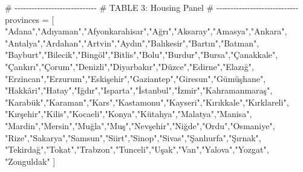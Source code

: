 \documentclass[
  11pt,
  a4paper,
]{article}
\newenvironment{Shaded}{\begin{snugshade}}{\end{snugshade}}
\newcommand{\CommentTok}[1]{\textcolor[rgb]{0.37,0.37,0.37}{#1}}
\newcommand{\NormalTok}[1]{\textcolor[rgb]{0.00,0.23,0.31}{#1}}
\newcommand{\OperatorTok}[1]{\textcolor[rgb]{0.37,0.37,0.37}{#1}}
\newcommand{\StringTok}[1]{\textcolor[rgb]{0.13,0.47,0.30}{#1}}
\begin{document}
\begin{Shaded}
\begin{Highlighting}[]
\CommentTok{\# {-}{-}{-}{-}{-}{-}{-}{-}{-}{-}{-}{-}{-}{-}{-}{-}{-}{-}{-}{-}{-}{-}{-}{-}{-}{-}{-}{-}{-}}
\CommentTok{\# TABLE 3: Housing Panel}
\CommentTok{\# {-}{-}{-}{-}{-}{-}{-}{-}{-}{-}{-}{-}{-}{-}{-}{-}{-}{-}{-}{-}{-}{-}{-}{-}{-}{-}{-}{-}{-}}
\NormalTok{provinces }\OperatorTok{=}\NormalTok{ [}
    \StringTok{"Adana"}\NormalTok{,}\StringTok{"Adıyaman"}\NormalTok{,}\StringTok{"Afyonkarahisar"}\NormalTok{,}\StringTok{"Ağrı"}\NormalTok{,}\StringTok{"Aksaray"}\NormalTok{,}\StringTok{"Amasya"}\NormalTok{,}\StringTok{"Ankara"}\NormalTok{,}
    \StringTok{"Antalya"}\NormalTok{,}\StringTok{"Ardahan"}\NormalTok{,}\StringTok{"Artvin"}\NormalTok{,}\StringTok{"Aydın"}\NormalTok{,}\StringTok{"Balıkesir"}\NormalTok{,}\StringTok{"Bartın"}\NormalTok{,}\StringTok{"Batman"}\NormalTok{,}
    \StringTok{"Bayburt"}\NormalTok{,}\StringTok{"Bilecik"}\NormalTok{,}\StringTok{"Bingöl"}\NormalTok{,}\StringTok{"Bitlis"}\NormalTok{,}\StringTok{"Bolu"}\NormalTok{,}\StringTok{"Burdur"}\NormalTok{,}\StringTok{"Bursa"}\NormalTok{,}\StringTok{"Çanakkale"}\NormalTok{,}
    \StringTok{"Çankırı"}\NormalTok{,}\StringTok{"Çorum"}\NormalTok{,}\StringTok{"Denizli"}\NormalTok{,}\StringTok{"Diyarbakır"}\NormalTok{,}\StringTok{"Düzce"}\NormalTok{,}\StringTok{"Edirne"}\NormalTok{,}\StringTok{"Elazığ"}\NormalTok{,}
    \StringTok{"Erzincan"}\NormalTok{,}\StringTok{"Erzurum"}\NormalTok{,}\StringTok{"Eskişehir"}\NormalTok{,}\StringTok{"Gaziantep"}\NormalTok{,}\StringTok{"Giresun"}\NormalTok{,}\StringTok{"Gümüşhane"}\NormalTok{,}
    \StringTok{"Hakkâri"}\NormalTok{,}\StringTok{"Hatay"}\NormalTok{,}\StringTok{"Iğdır"}\NormalTok{,}\StringTok{"Isparta"}\NormalTok{,}\StringTok{"İstanbul"}\NormalTok{,}\StringTok{"İzmir"}\NormalTok{,}\StringTok{"Kahramanmaraş"}\NormalTok{,}
    \StringTok{"Karabük"}\NormalTok{,}\StringTok{"Karaman"}\NormalTok{,}\StringTok{"Kars"}\NormalTok{,}\StringTok{"Kastamonu"}\NormalTok{,}\StringTok{"Kayseri"}\NormalTok{,}\StringTok{"Kırıkkale"}\NormalTok{,}\StringTok{"Kırklareli"}\NormalTok{,}
    \StringTok{"Kırşehir"}\NormalTok{,}\StringTok{"Kilis"}\NormalTok{,}\StringTok{"Kocaeli"}\NormalTok{,}\StringTok{"Konya"}\NormalTok{,}\StringTok{"Kütahya"}\NormalTok{,}\StringTok{"Malatya"}\NormalTok{,}\StringTok{"Manisa"}\NormalTok{,}
    \StringTok{"Mardin"}\NormalTok{,}\StringTok{"Mersin"}\NormalTok{,}\StringTok{"Muğla"}\NormalTok{,}\StringTok{"Muş"}\NormalTok{,}\StringTok{"Nevşehir"}\NormalTok{,}\StringTok{"Niğde"}\NormalTok{,}\StringTok{"Ordu"}\NormalTok{,}\StringTok{"Osmaniye"}\NormalTok{,}
    \StringTok{"Rize"}\NormalTok{,}\StringTok{"Sakarya"}\NormalTok{,}\StringTok{"Samsun"}\NormalTok{,}\StringTok{"Siirt"}\NormalTok{,}\StringTok{"Sinop"}\NormalTok{,}\StringTok{"Sivas"}\NormalTok{,}\StringTok{"Şanlıurfa"}\NormalTok{,}\StringTok{"Şırnak"}\NormalTok{,}
    \StringTok{"Tekirdağ"}\NormalTok{,}\StringTok{"Tokat"}\NormalTok{,}\StringTok{"Trabzon"}\NormalTok{,}\StringTok{"Tunceli"}\NormalTok{,}\StringTok{"Uşak"}\NormalTok{,}\StringTok{"Van"}\NormalTok{,}\StringTok{"Yalova"}\NormalTok{,}\StringTok{"Yozgat"}\NormalTok{,}
    \StringTok{"Zonguldak"}
\NormalTok{]}


\end{Highlighting}
\end{Shaded}
\end{document}
